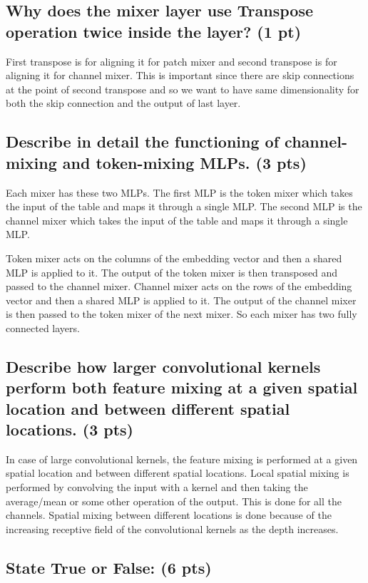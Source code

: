\documentclass{article}
\begin{document}
\subsection{Why does the mixer layer use Transpose operation twice inside the layer? (1 pt)}

First transpose is for aligning it for patch mixer and second transpose is for aligning it for channel mixer. This is important since there are skip connections at the point of second transpose and so we want to have same dimensionality for both the skip connection and the output of last layer.

\subsection{Describe in detail the functioning of channel-mixing and token-mixing MLPs. (3 pts)}

Each mixer has these two MLPs. The first MLP is the token mixer which takes the input of the table and maps it through a single MLP. The second MLP is the channel mixer which takes the input of the table and maps it through a single MLP.

Token mixer acts on the columns of the embedding vector and then a shared MLP is applied to it. The output of the token mixer is then transposed and passed to the channel mixer. Channel mixer acts on the rows of the embedding vector and then a shared MLP is applied to it. The output of the channel mixer is then passed to the token mixer of the next mixer. So each mixer has two fully connected layers.

\subsection{Describe how larger convolutional kernels perform both feature mixing at a given spatial location and between different spatial locations. (3 pts)}

In case of large convolutional kernels, the feature mixing is performed at a given spatial location and between different spatial locations. Local spatial mixing is performed by convolving the input with a kernel and then taking the average/mean or some other operation of the output. This is done for all the channels. Spatial mixing between different locations is done because of the increasing receptive field of the convolutional kernels as the depth increases.


\subsection{State True or False: (6 pts)}
\end{document}
